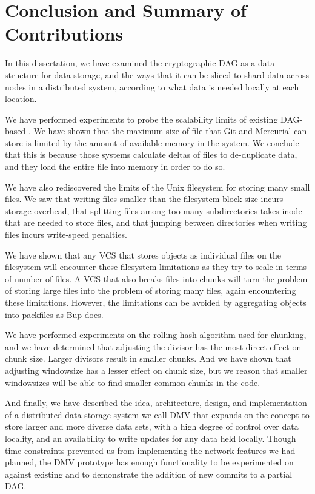 \chapter{Conclusion and Summary of Contributions}


In this dissertation, we have examined the cryptographic \acrfull{DAG} as a data
structure for data storage, and the ways that it can be sliced to shard data
across nodes in a distributed system, according to what data is needed locally
at each location.

We have performed experiments to probe the scalability limits of existing
\gls{DAG}-based . We have shown that the maximum size of file
that Git and Mercurial can store is limited by the amount of available memory in
the system. We conclude that this is because those systems calculate deltas of
files to de-duplicate data, and they load the entire file into memory in order
to do so.

We have also rediscovered the limits of the Unix filesystem for storing many
small files. We saw that writing files smaller than the filesystem block size
incurs storage overhead, that splitting files among too many subdirectories
takes \gls{inode} that are needed to store files, and that jumping between
directories when writing files incurs write-speed penalties.

We have shown that any \gls{VCS} that stores objects as individual files on the
filesystem will encounter these filesystem limitations as they try to scale in
terms of number of files. A \gls{VCS} that also breaks files into chunks will
turn the problem of storing large files into the problem of storing many files,
again encountering these limitations. However, the limitations can be avoided by
aggregating objects into \glspl{packfile} as Bup does.

We have performed experiments on the rolling hash algorithm used for chunking,
and we have determined that adjusting the \gls{divisor} has the most direct
effect on chunk size. Larger \glspl{divisor} result in smaller chunks. And we
have shown that adjusting \gls{windowsize} has a lesser effect on chunk size,
but we reason that smaller \glspl{windowsize} will be able to find smaller
common chunks in the code.

And finally, we have described the idea, architecture, design, and
implementation of a distributed data storage system we call \gls{DMV} that
expands on the  concept to store
larger and more diverse data sets, with a high degree of control over data
locality, and an availability to write updates for any data held locally. Though
time constraints prevented us from implementing the network features we had
planned, the \gls{DMV} prototype has enough functionality to be experimented on
against existing  and to demonstrate the addition of new
\glspl{commit} to a partial \gls{DAG}.
